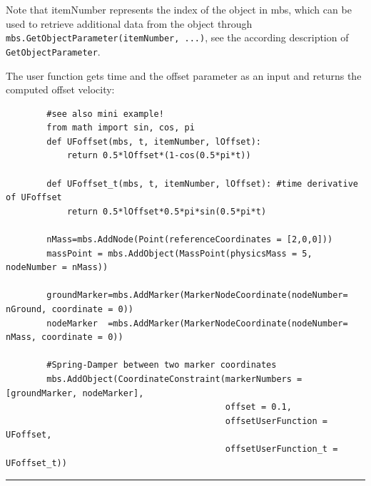     Note that itemNumber represents the index of the object in mbs, which can be used to retrieve additional data from the object through
    \texttt{mbs.GetObjectParameter(itemNumber, ...)}, see the according description of \texttt{GetObjectParameter}.

    The user function gets time and the offset parameter as an input and returns the computed offset velocity:
    \finishTable
    \userFunctionExample{}
    \pythonstyle\begin{lstlisting}
        #see also mini example!
        from math import sin, cos, pi
        def UFoffset(mbs, t, itemNumber, lOffset): 
            return 0.5*lOffset*(1-cos(0.5*pi*t))
        
        def UFoffset_t(mbs, t, itemNumber, lOffset): #time derivative of UFoffset
            return 0.5*lOffset*0.5*pi*sin(0.5*pi*t)

        nMass=mbs.AddNode(Point(referenceCoordinates = [2,0,0]))
        massPoint = mbs.AddObject(MassPoint(physicsMass = 5, nodeNumber = nMass))
        
        groundMarker=mbs.AddMarker(MarkerNodeCoordinate(nodeNumber= nGround, coordinate = 0))
        nodeMarker  =mbs.AddMarker(MarkerNodeCoordinate(nodeNumber= nMass, coordinate = 0))
        
        #Spring-Damper between two marker coordinates
        mbs.AddObject(CoordinateConstraint(markerNumbers = [groundMarker, nodeMarker], 
                                           offset = 0.1, 
                                           offsetUserFunction = UFoffset, 
                                           offsetUserFunction_t = UFoffset_t)) 
    \end{lstlisting}
\vspace{6pt}\par\noindent\rule{\textwidth}{0.4pt}
